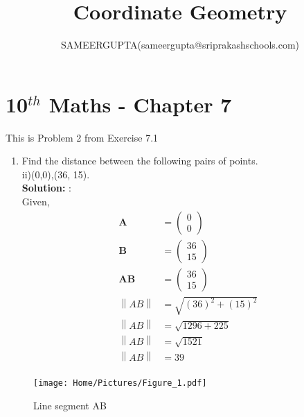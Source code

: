 \documentclass[12pt]{article}
\title{Coordinate Geometry}
\author{SAMEERGUPTA(sameergupta@sriprakashschools.com)}
\newcommand{\myvec}[1]{\ensuremath{\begin{pmatrix}#1\end{pmatrix}}}
\newcommand{\solution}{\noindent \textbf{Solution: }}
\providecommand{\norm}[1]{\left\lVert#1\right\rVert}
\let\vec\mathbf
\begin{document}
\maketitle
\section*{10$^{th}$ Maths - Chapter 7}
This is Problem 2 from Exercise 7.1
\begin{enumerate}
\item Find the distance between the following pairs of points.\\
 ii)(0,0),(36, 15).\\
\solution:\\
Given,
\begin{align}
\vec{A}&=\myvec{0\\0}\\
\vec{B}&=\myvec{36\\15}\\
\vec{AB}&=\myvec{36\\15}\\
\norm{AB}&=\sqrt{(36)^2+(15)^2}\\
\norm{AB}&=\sqrt{1296+225}\\
\norm{AB}&=\sqrt{1521}\\
\norm{AB}&=39\\
\end{align}
\end{enumerate}
\begin{figure}[H]
			\centering
			\texttt{[image: Home/Pictures/Figure\_1.pdf]}
			\caption{Line segment AB}
			\label{fig:19}
		\end{figure}
\end{document}
